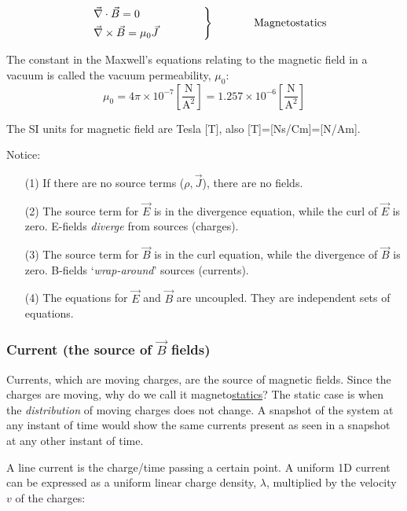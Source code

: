 \documentclass[12pt]{article}
\begin{document}
\begin{flushleft}
\begin{equation*}
\begin{rcases}
&  \vec{\nabla} \cdot \vec{B}  = 0 \hspace{.8in} \\ 
&  \vec{\nabla} \times \vec{B} = \mu_{0}\vec{J}
\end{rcases}
\hspace{.5in} \text{Magnetostatics}
\end{equation*}

The constant in the Maxwell's equations relating to the magnetic field in a vacuum is called the vacuum permeability, $\mu_{0}$:
\[
\mu_{0} = 4\pi \times 10^{-7} \left[ \frac{\mbox{N}}{\mbox{A}^{2}} \right] = 1.257 \times 10^{-6} \left[ \frac{\mbox{N}}{\mbox{A}^{2}} \right]
\]

The SI units for magnetic field are Tesla [T], also [T]=[Ns/Cm]=[N/Am].

Notice:
\vspace{-.1in}
\begin{itemize}
\item[(1)] If there are no source terms ($\rho, \vec{J}$), there are no fields.
\item[(2)] The source term for $\vec{E}$ is in the divergence equation, while the curl of $\vec{E}$ is zero.  E-fields {\it diverge} from sources (charges).
\item[(3)] The source term for $\vec{B}$ is in the curl equation, while the divergence of $\vec{B}$ is zero.  B-fields `{\it wrap-around}' sources (currents).
\item[(4)] The equations for $\vec{E}$ and $\vec{B}$ are uncoupled.  They are independent sets of equations.
\end{itemize}

\subsubsection*{\bf Current (the source of $\vec{B}$ fields)}
\vspace{-.1in}
Currents, which are moving charges, are the source of magnetic fields.  Since the charges are moving, why do we call it magneto\underline{statics}?  The static case is when the {\it distribution} of moving charges does not change.  A snapshot of the system at any instant of time would show the same currents present as seen in a snapshot at any other instant of time.

A line current is the charge/time passing a certain point.  A uniform 1D current can be expressed as a uniform linear charge density, $\lambda$, multiplied by the velocity $v$ of the charges:


\end{flushleft}
\end{document}

